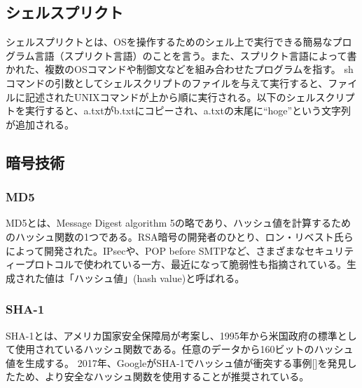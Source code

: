 \subsection{シェルスプリクト}
シェルスプリクトとは、OSを操作するためのシェル上で実行できる簡易なプログラム言語（スプリクト言語）のことを言う。また、スプリクト言語によって書かれた、複数のOSコマンドや制御文などを組み合わせたプログラムを指す。
shコマンドの引数としてシェルスクリプトのファイルを与えて実行すると、ファイルに記述されたUNIXコマンドが上から順に実行される。以下のシェルスクリプトを実行すると、a.txtがb.txtにコピーされ、a.txtの末尾に“hoge”という文字列が追加される。



\subsection{暗号技術}

\subsubsection {MD5}
MD5とは、Message Digest algorithm 5の略であり、ハッシュ値を計算するためのハッシュ関数の1つである。RSA暗号の開発者のひとり、ロン・リベスト氏らによって開発された。IPsecや、POP before SMTPなど、さまざまなセキュリティープロトコルで使われている一方、最近になって脆弱性も指摘されている。生成された値は「ハッシュ値」(hash value)と呼ばれる。

\subsubsection {SHA-1}
SHA-1とは、アメリカ国家安全保障局が考案し、1995年から米国政府の標準として使用されているハッシュ関数である。任意のデータから160ビットのハッシュ値を生成する。
2017年、GoogleがSHA-1でハッシュ値が衝突する事例[]を発見したため、より安全なハッシュ関数を使用することが推奨されている。

